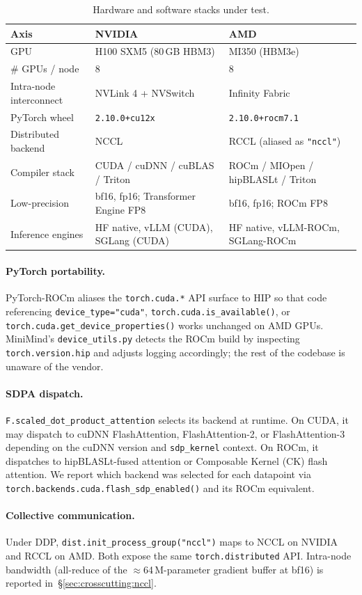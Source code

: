 \begin{table}[h]
\centering
\caption{Hardware and software stacks under test.}
\label{tab:hw}
\small
\begin{tabular}{lll}
\toprule
\textbf{Axis} & \textbf{NVIDIA} & \textbf{AMD} \\
\midrule
GPU & H100 SXM5 (80\,GB HBM3) & MI350 (HBM3e) \\
\# GPUs / node & 8 & 8 \\
Intra-node interconnect & NVLink 4 + NVSwitch & Infinity Fabric \\
PyTorch wheel & \texttt{2.10.0+cu12x} & \texttt{2.10.0+rocm7.1} \\
Distributed backend & NCCL & RCCL (aliased as \texttt{"nccl"}) \\
Compiler stack & CUDA / cuDNN / cuBLAS / Triton & ROCm / MIOpen / hipBLASLt / Triton \\
Low-precision & bf16, fp16; Transformer Engine FP8 & bf16, fp16; ROCm FP8 \\
Inference engines & HF native, vLLM (CUDA), SGLang (CUDA) & HF native, vLLM-ROCm, SGLang-ROCm \\
\bottomrule
\end{tabular}
\end{table}

\paragraph{PyTorch portability.}
PyTorch-ROCm aliases the \texttt{torch.cuda.*} API surface to HIP so that code
referencing \texttt{device\_type="cuda"}, \texttt{torch.cuda.is\_available()},
or \texttt{torch.cuda.get\_device\_properties()} works unchanged on AMD GPUs.
MiniMind's \texttt{device\_utils.py} detects the ROCm build by inspecting
\texttt{torch.version.hip} and adjusts logging accordingly; the rest of the
codebase is unaware of the vendor.

\paragraph{SDPA dispatch.}
\texttt{F.scaled\_dot\_product\_attention} selects its backend at runtime.  On
CUDA, it may dispatch to cuDNN FlashAttention, FlashAttention-2, or
FlashAttention-3 depending on the cuDNN version and \texttt{sdp\_kernel} context.
On ROCm, it dispatches to hipBLASLt-fused attention or Composable Kernel (CK)
flash attention.  We report which backend was selected for each datapoint via
\texttt{torch.backends.cuda.flash\_sdp\_enabled()} and its ROCm equivalent.

\paragraph{Collective communication.}
Under DDP, \texttt{dist.init\_process\_group("nccl")} maps to NCCL on NVIDIA and
RCCL on AMD.  Both expose the same \texttt{torch.distributed} API.  Intra-node
bandwidth (all-reduce of the $\approx$64\,M-parameter gradient buffer at bf16)
is reported in~\S\ref{sec:crosscutting:nccl}.
